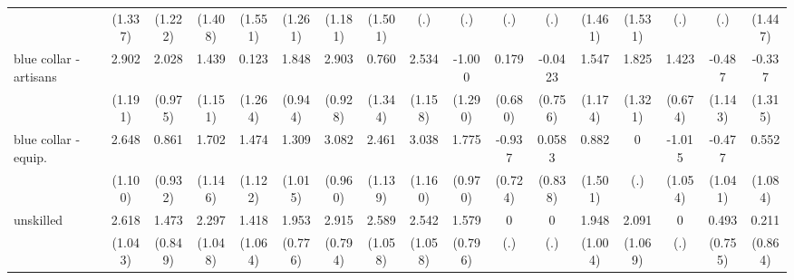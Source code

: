 {\begin{tabular}{l*{16}{c}}
                    &     (1.337)         &     (1.222)         &     (1.408)         &     (1.551)         &     (1.261)         &     (1.181)         &     (1.501)         &         (.)         &         (.)         &         (.)         &         (.)         &     (1.461)         &     (1.531)         &         (.)         &         (.)         &     (1.447)         \\
[1em]
blue collar - artisans&       2.902\sym{*}  &       2.028\sym{*}  &       1.439         &       0.123         &       1.848         &       2.903\sym{**} &       0.760         &       2.534\sym{*}  &      -1.000         &       0.179         &     -0.0423         &       1.547         &       1.825         &       1.423\sym{*}  &      -0.487         &      -0.337         \\
                    &     (1.191)         &     (0.975)         &     (1.151)         &     (1.264)         &     (0.944)         &     (0.928)         &     (1.344)         &     (1.158)         &     (1.290)         &     (0.680)         &     (0.756)         &     (1.174)         &     (1.321)         &     (0.674)         &     (1.143)         &     (1.315)         \\
[1em]
blue collar - equip.&       2.648\sym{*}  &       0.861         &       1.702         &       1.474         &       1.309         &       3.082\sym{**} &       2.461\sym{*}  &       3.038\sym{**} &       1.775         &      -0.937         &      0.0583         &       0.882         &           0         &      -1.015         &      -0.477         &       0.552         \\
                    &     (1.100)         &     (0.932)         &     (1.146)         &     (1.122)         &     (1.015)         &     (0.960)         &     (1.139)         &     (1.160)         &     (0.970)         &     (0.724)         &     (0.838)         &     (1.501)         &         (.)         &     (1.054)         &     (1.041)         &     (1.084)         \\
[1em]
unskilled           &       2.618\sym{*}  &       1.473         &       2.297\sym{*}  &       1.418         &       1.953\sym{*}  &       2.915\sym{***}&       2.589\sym{*}  &       2.542\sym{*}  &       1.579\sym{*}  &           0         &           0         &       1.948         &       2.091         &           0         &       0.493         &       0.211         \\
                    &     (1.043)         &     (0.849)         &     (1.048)         &     (1.064)         &     (0.776)         &     (0.794)         &     (1.058)         &     (1.058)         &     (0.796)         &         (.)         &         (.)         &     (1.004)         &     (1.069)         &         (.)         &     (0.755)         &     (0.864)         \\

\end{tabular}}
